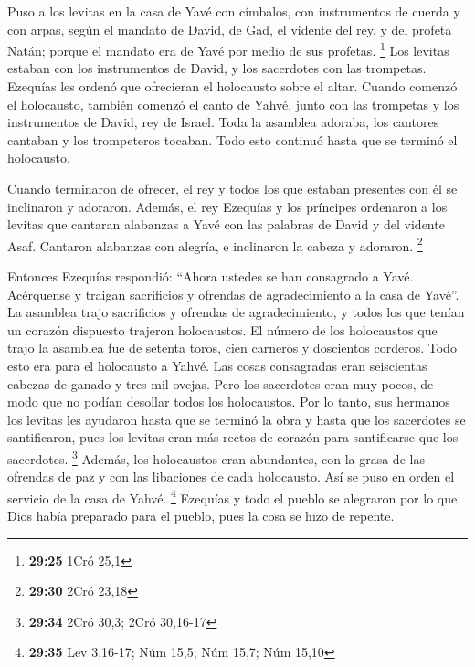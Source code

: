 \begin{paracol}{2}
 Puso a los levitas en la casa de Yavé con címbalos, con
instrumentos de cuerda y con arpas, según el mandato de David, de Gad,
el vidente del rey, y del profeta Natán; porque el mandato era de Yavé
por medio de sus profetas. \footnote{\textbf{29:25} 1Cró 25,1}
 Los levitas estaban con los instrumentos de David, y los
sacerdotes con las trompetas.  Ezequías les ordenó que
ofrecieran el holocausto sobre el altar. Cuando comenzó el holocausto,
también comenzó el canto de Yahvé, junto con las trompetas y los
instrumentos de David, rey de Israel.  Toda la asamblea
adoraba, los cantores cantaban y los trompeteros tocaban. Todo esto
continuó hasta que se terminó el holocausto.

 Cuando terminaron de ofrecer, el rey y todos los que
estaban presentes con él se inclinaron y adoraron. 
Además, el rey Ezequías y los príncipes ordenaron a los levitas que
cantaran alabanzas a Yavé con las palabras de David y del vidente Asaf.
Cantaron alabanzas con alegría, e inclinaron la cabeza y adoraron.
\footnote{\textbf{29:30} 2Cró 23,18}

 Entonces Ezequías respondió: ``Ahora ustedes se han
consagrado a Yavé. Acérquense y traigan sacrificios y ofrendas de
agradecimiento a la casa de Yavé''. La asamblea trajo sacrificios y
ofrendas de agradecimiento, y todos los que tenían un corazón dispuesto
trajeron holocaustos.  El número de los holocaustos que
trajo la asamblea fue de setenta toros, cien carneros y doscientos
corderos. Todo esto era para el holocausto a Yahvé.  Las
cosas consagradas eran seiscientas cabezas de ganado y tres mil ovejas.
 Pero los sacerdotes eran muy pocos, de modo que no
podían desollar todos los holocaustos. Por lo tanto, sus hermanos los
levitas les ayudaron hasta que se terminó la obra y hasta que los
sacerdotes se santificaron, pues los levitas eran más rectos de corazón
para santificarse que los sacerdotes. \footnote{\textbf{29:34} 2Cró
  30,3; 2Cró 30,16-17}  Además, los holocaustos eran
abundantes, con la grasa de las ofrendas de paz y con las libaciones de
cada holocausto. Así se puso en orden el servicio de la casa de Yahvé.
\footnote{\textbf{29:35} Lev 3,16-17; Núm 15,5; Núm 15,7; Núm 15,10}
 Ezequías y todo el pueblo se alegraron por lo que Dios
había preparado para el pueblo, pues la cosa se hizo de repente.

\switchcolumn
\begin{otherlanguage}{english}


\end{otherlanguage}
\end{paracol}
